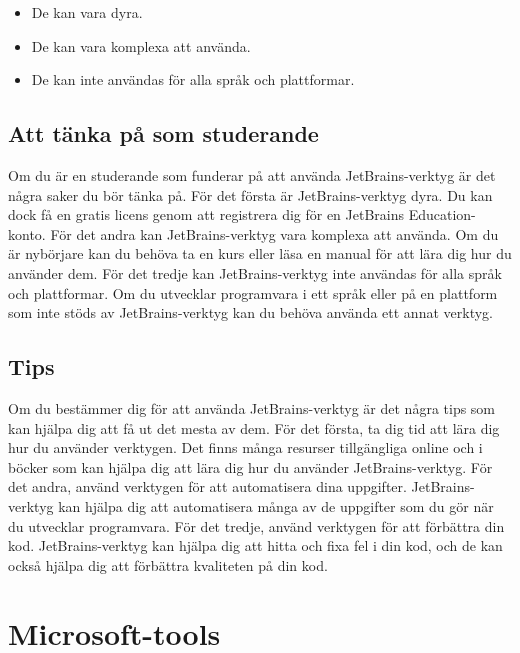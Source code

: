 \begin{itemize}
\tightlist
\item
  De kan vara dyra.
\item
  De kan vara komplexa att använda.
\item
  De kan inte användas för alla språk och plattformar.
\end{itemize}

\hypertarget{att-tuxe4nka-puxe5-som-studerande}{%
\subsection{Att tänka på som
studerande}\label{att-tuxe4nka-puxe5-som-studerande}}

Om du är en studerande som funderar på att använda JetBrains-verktyg är
det några saker du bör tänka på. För det första är JetBrains-verktyg
dyra. Du kan dock få en gratis licens genom att registrera dig för en
JetBrains Education-konto. För det andra kan JetBrains-verktyg vara
komplexa att använda. Om du är nybörjare kan du behöva ta en kurs eller
läsa en manual för att lära dig hur du använder dem. För det tredje kan
JetBrains-verktyg inte användas för alla språk och plattformar. Om du
utvecklar programvara i ett språk eller på en plattform som inte stöds
av JetBrains-verktyg kan du behöva använda ett annat verktyg.

\hypertarget{tips}{%
\subsection{Tips}\label{tips}}

Om du bestämmer dig för att använda JetBrains-verktyg är det några tips
som kan hjälpa dig att få ut det mesta av dem. För det första, ta dig
tid att lära dig hur du använder verktygen. Det finns många resurser
tillgängliga online och i böcker som kan hjälpa dig att lära dig hur du
använder JetBrains-verktyg. För det andra, använd verktygen för att
automatisera dina uppgifter. JetBrains-verktyg kan hjälpa dig att
automatisera många av de uppgifter som du gör när du utvecklar
programvara. För det tredje, använd verktygen för att förbättra din kod.
JetBrains-verktyg kan hjälpa dig att hitta och fixa fel i din kod, och
de kan också hjälpa dig att förbättra kvaliteten på din kod.

\hypertarget{microsoft-tools}{%
\section{Microsoft-tools}\label{microsoft-tools}}

